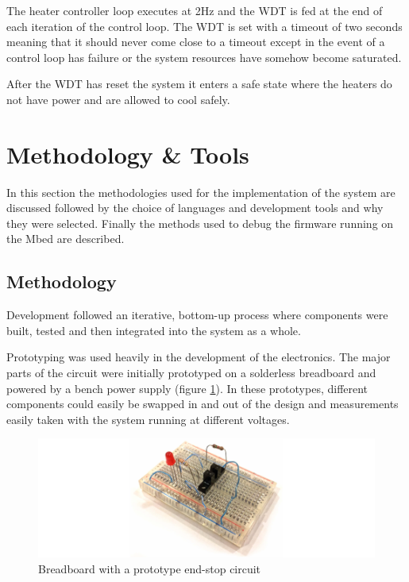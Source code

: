 			The heater controller loop executes at 2Hz and the WDT is fed at the end
			of each iteration of the control loop. The WDT is set with a timeout of
			two seconds meaning that it should never come close to a timeout except in
			the event of a control loop has failure or the system resources have
			somehow become saturated.
			
			After the WDT has reset the system it enters a safe state where the
			heaters do not have power and are allowed to cool safely.
	
	\section{Methodology \& Tools}
		
		In this section the methodologies used for the implementation of the system
		are discussed followed by the choice of languages and development tools and
		why they were selected. Finally the methods used to debug the firmware
		running on the Mbed are described.
		
		\subsection{Methodology}
		
			Development followed an iterative, bottom-up process where components were
			built, tested and then integrated into the system as a whole.
			
			Prototyping was used heavily in the development of the electronics. The
			major parts of the circuit were initially prototyped on a solderless
			breadboard and powered by a bench power supply (figure
			\ref{fig:breadboard}). In these prototypes, different components could
			easily be swapped in and out of the design and measurements easily taken
			with the system running at different voltages.
			
			\begin{figure}
				\includegraphics[width=1\textwidth]{diagrams/breadboard.pdf}
				\caption{Breadboard with a prototype end-stop circuit}
				\label{fig:breadboard}
			\end{figure}
			
